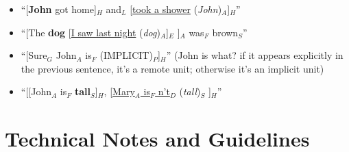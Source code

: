 \documentclass[11pt]{article}
\newcommand{\dd}[1]{{\color{blue}{#1}}}
\newcommand{\dcom}[1]{\textit{\color{blue}{#1}}}
\newcommand{\oa}[1]{{\color{blue}{OA: #1}}}
\newcommand{\nss}[1]{{\color{magenta}{NSS: #1}}}
\newcommand{\rem}[1]{{(\it #1})}
\begin{document}
\begin{enumerate}
\begin{itemize}
\item	``[{\bf John} got home]$_H$ and$_L$ [\underline{took a shower} \rem{John}$_A$]$_{H}$''
\item	``[The {\bf dog} [\underline{I saw last night} \rem{dog}$_A$]$_{E}$ ]$_A$ was$_F$ brown$_S$''
\item 	``[Sure$_G$ John$_A$ is$_F$ (IMPLICIT)$_P$]$_H$'' (John is what? if it appears explicitly in the previous sentence, it's a remote unit; otherwise it's an implicit unit)
\item   ``[[John$_A$ is$_F$ {\bf tall}$_S$]$_H$, [\underline{Mary$_A$ is$_F$ n't$_D$} \rem{tall}$_S$ ]$_H$''
\end{itemize}

\end{enumerate}

\section{Technical Notes and Guidelines}
\end{document}

